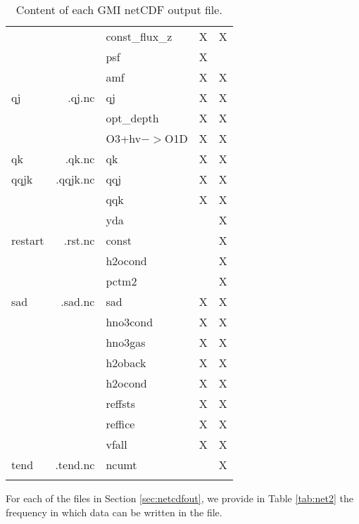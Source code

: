 \begin{center}
\begin{longtable}{|l|r|l|l|l|}
             &                  & const\_flux\_z & X    &    X     \\
             &                  & psf            & X    &         \\
             &                  & amf            & X    &    X     \\ \hline
%
qj    &   .qj.nc    & qj                & X    &    X     \\
      &             &  opt\_depth       & X    &    X     \\
      &             &  O3+hv$->$O1D     & X    &    X     \\ \hline
%
qk    &   .qk.nc    & qk                & X    &    X     \\ \hline
%
qqjk  &   .qqjk.nc  & qqj               & X    &    X      \\
      &             & qqk               & X    &    X      \\
      &             & yda               &      &    X      \\ \hline
%
restart & .rst.nc   & const             &      &    X      \\
        &           & h2ocond           &      &    X      \\
        &           & pctm2             &      &    X      \\ \hline
%
sad     & .sad.nc   & sad               & X    &    X      \\
        &           & hno3cond          & X    &    X      \\
        &           & hno3gas           & X    &    X      \\
        &           & h2oback           & X    &    X      \\
        &           & h2ocond           & X    &    X      \\
        &           & reffsts           & X    &    X      \\
        &           & reffice           & X    &    X      \\
        &           & vfall             & X    &    X      \\ \hline
%
tend    & .tend.nc  & ncumt             &      &    X     \\ \hline\hline
%
\caption{Content of each GMI netCDF output file.}
\label{tab:net1}
\end{longtable}
\end{center}

%
For each of the files in Section \ref{sec:netcdfout}, we provide in 
Table \ref{tab:net2} the frequency in which data can be written in the file.

